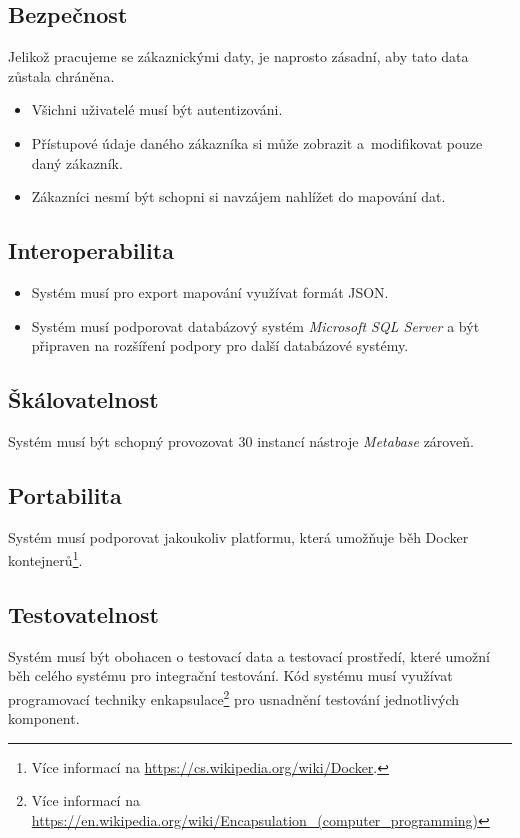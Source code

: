 \subsection{Bezpečnost}

Jelikož pracujeme se zákaznickými daty, je naprosto zásadní, aby tato data zůstala chráněna.

\begin{itemize}
    \item Všichni uživatelé musí být autentizováni.
    \item Přístupové údaje daného zákazníka si může zobrazit a~modifikovat pouze daný zákazník.
    \item Zákazníci nesmí být schopni si navzájem nahlížet do mapování dat. 
\end{itemize}

\subsection{Interoperabilita}
\begin{itemize}
    \item Systém musí pro export mapování využívat formát JSON.
    \item Systém musí podporovat databázový systém \textit{Microsoft SQL Server} a být připraven na rozšíření podpory pro další databázové systémy.
\end{itemize}

\subsection{Škálovatelnost}

Systém musí být schopný provozovat 30 instancí nástroje \textit{Metabase} zároveň.

\subsection{Portabilita}

Systém musí podporovat jakoukoliv platformu, která umožňuje běh Docker kontejnerů\footnote{Více informací na \url{https://cs.wikipedia.org/wiki/Docker}.}.

\subsection{Testovatelnost}

Systém musí být obohacen o testovací data a testovací prostředí, které umožní běh celého systému pro integrační testování.
Kód systému musí využívat programovací techniky enkapsulace\footnote{Více informací na \url{https://en.wikipedia.org/wiki/Encapsulation_(computer_programming)}} pro usnadnění testování jednotlivých komponent.